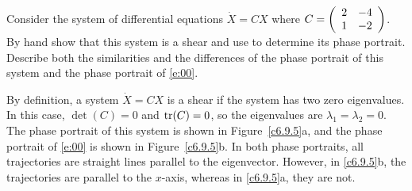 \documentclass{ximera}
\begin{document}
\begin{exercise} \label{c6.9.5}
Consider the system of differential equations $\dot{X}=CX$ where
$C=\left(\begin{array}{rr} 2 & -4\\ 1 &-2\end{array}\right)$.  By hand show that this system is a shear and
use {\pplane} to determine its phase portrait.  Describe both the
similarities and the differences of the phase portrait of this system
and the phase portrait of \eqref{e:00}.

\begin{solution}

By definition, a system $\dot{X} = CX$ is a shear if the system has two
zero eigenvalues.  In this case, $\det(C) = 0$ and ${\rm tr}(C) = 0$, so
the eigenvalues are $\lambda_1 = \lambda_2 = 0$.  The phase portrait of
this system is shown in Figure~\ref{c6.9.5}a, and the phase portrait of
\eqref{e:00} is shown in Figure~\ref{c6.9.5}b.  In both phase portraits,
all trajectories are straight lines parallel to the eigenvector.  However,
in \ref{c6.9.5}b, the trajectories are parallel to the $x$-axis, whereas
in \ref{c6.9.5}a, they are not.

\begin{figure}[htb]
                       \centerline{%
                       }
\end{figure}







\end{solution}
\end{exercise}
\end{document}
